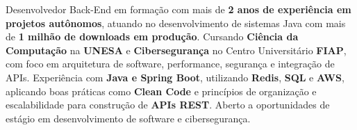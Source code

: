 

\begin{cvparagraph}

Desenvolvedor Back-End em formação com mais de \textbf{2 anos de experiência em projetos autônomos}, atuando no desenvolvimento de sistemas Java com mais de \textbf{1 milhão de downloads em produção}. Cursando \textbf{Ciência da Computação} na \textbf{UNESA} e \textbf{Cibersegurança} no Centro Universitário \textbf{FIAP}, com foco em arquitetura de software, performance, segurança e integração de APIs. Experiência com \textbf{Java e Spring Boot}, utilizando \textbf{Redis}, \textbf{SQL} e \textbf{AWS}, aplicando boas práticas como \textbf{Clean Code} e princípios de organização e escalabilidade para construção de \textbf{APIs REST}. Aberto a oportunidades de estágio em desenvolvimento de software e cibersegurança.
\end{cvparagraph}
